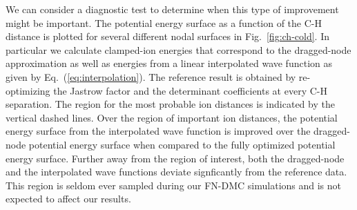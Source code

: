 \documentclass[aip,jcp,numerical,reprint]{revtex4-1}
\begin{document}

We can consider a diagnostic test to determine when this type of improvement might be important.  The potential energy surface as a function of the C-H distance is plotted for several different nodal surfaces in Fig.~\ref{fig:ch-cold}. In particular we calculate clamped-ion energies that correspond to the dragged-node approximation as well as energies from a  linear interpolated wave function as given by Eq.~(\ref{eq:interpolation}). %
The reference result is obtained by re-optimizing the Jastrow factor and the determinant coefficients at every C-H separation.   The region for the most probable ion distances is indicated by the vertical dashed lines.  Over the region of important ion distances,  the potential energy surface from the interpolated wave function is improved over the dragged-node potential energy surface when compared to the fully optimized potential energy surface.  %
Further away from the region of interest, both the dragged-node and the interpolated wave functions deviate signficantly from the reference data.  
This region is seldom ever sampled during our FN-DMC simulations and is not expected to affect our results. 
\end{document}
